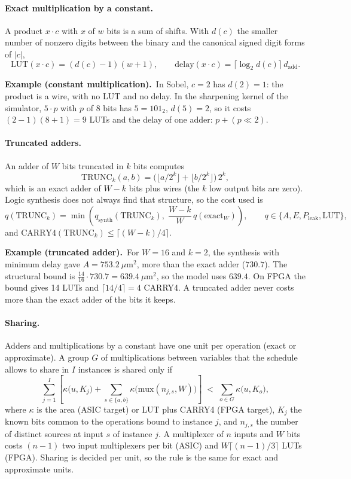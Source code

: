 \documentclass[11pt,a4paper]{article}
\newcommand{\examplebox}[2]{\par\medskip\noindent\colorbox{tabAzul!6}{\begin{minipage}{\dimexpr\linewidth-2\fboxsep}
  \textbf{Example (#1).}\ #2\end{minipage}}\par\medskip}
\begin{document}
\paragraph{Exact multiplication by a constant.} A product $x \cdot c$ with $x$ of $w$ bits is a sum of shifts. With
$d(c)$ the smaller number of nonzero digits between the binary and the canonical signed digit forms of $|c|$,
\[
  \text{LUT}(x \cdot c) = (d(c) - 1)(w + 1), \qquad
  \text{delay}(x \cdot c) = \lceil \log_2 d(c) \rceil \, d_{\text{add}} .
\]

\examplebox{constant multiplication}{In Sobel, $c = 2$ has $d(2) = 1$: the product is a wire, with no LUT and no
delay. In the sharpening kernel of the simulator, $5 \cdot p$ with $p$ of 8 bits has $5 = 101_2$, $d(5) = 2$, so it
costs $(2 - 1)(8 + 1) = 9$ LUTs and the delay of one adder: $p + (p \ll 2)$.}

\paragraph{Truncated adders.} An adder of $W$ bits truncated in $k$ bits computes
\[
  \text{TRUNC}_k(a, b) = \Big( \big\lfloor a / 2^k \big\rfloor + \big\lfloor b / 2^k \big\rfloor \Big)\, 2^k ,
\]
which is an exact adder of $W - k$ bits plus wires (the $k$ low output bits are zero). Logic synthesis does not always
find that structure, so the cost used is
\[
  q(\text{TRUNC}_k) = \min\left( q_{\text{synth}}(\text{TRUNC}_k),\; \frac{W - k}{W}\, q(\text{exact}_W) \right),
  \qquad q \in \{ A, E, P_{\text{leak}}, \text{LUT} \},
\]
and $\text{CARRY4}(\text{TRUNC}_k) \le \lceil (W - k)/4 \rceil$.

\examplebox{truncated adder}{For $W = 16$ and $k = 2$, the synthesis with minimum delay gave
$A = 753.2\ \mu\text{m}^2$, more than the exact adder ($730.7$). The structural bound is
$\tfrac{14}{16} \cdot 730.7 = 639.4\ \mu\text{m}^2$, so the model uses $639.4$. On FPGA the bound gives 14 LUTs and
$\lceil 14/4 \rceil = 4$ CARRY4. A truncated adder never costs more than the exact adder of the bits it keeps.}

\paragraph{Sharing.} Adders and multiplications by a constant have one unit per operation (exact or approximate). A
group $G$ of multiplications between variables that the schedule allows to share in $I$ instances is shared only if
\[
  \sum_{j=1}^{I} \left[ \kappa\big(u, K_j\big) + \sum_{s \in \{a,b\}} \kappa\big(\text{mux}(n_{j,s}, W)\big) \right]
  \;<\; \sum_{o \in G} \kappa\big(u, K_o\big),
\]
where $\kappa$ is the area (ASIC target) or LUT plus CARRY4 (FPGA target), $K_j$ the known bits common to the operations
bound to instance $j$, and $n_{j,s}$ the number of distinct sources at input $s$ of instance $j$. A multiplexer of $n$
inputs and $W$ bits costs $(n - 1)$ two input multiplexers per bit (ASIC) and $W \lceil (n-1)/3 \rceil$ LUTs (FPGA).
Sharing is decided per unit, so the rule is the same for exact and approximate units.
\end{document}
